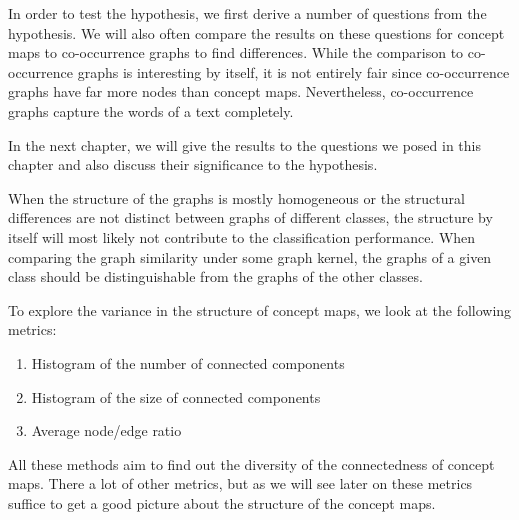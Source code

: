 


In order to test the hypothesis, we first derive a number of questions from the hypothesis.
We will also often compare the results on these questions for concept maps to co-occurrence graphs to find differences. While the comparison to co-occurrence graphs is interesting by itself, it is not entirely fair since co-occurrence graphs have far more nodes than concept maps.
Nevertheless, co-occurrence graphs capture the words of a text completely.

In the next chapter, we will give the results to the questions we posed in this chapter and also discuss their significance to the hypothesis.


When the structure of the graphs is mostly homogeneous or the structural differences are not distinct between graphs of different classes, the structure by itself will most likely not contribute to the classification performance.
When comparing the graph similarity under some graph kernel, the graphs of a given class should be distinguishable from the graphs of the other classes.

To explore the variance in the structure of concept maps, we look at the following metrics:
\begin{enumerate}
    \item{Histogram of the number of connected components}
    \item{Histogram of the size of connected components}
    \item{Average node/edge ratio}
\end{enumerate}

All these methods aim to find out the diversity of the connectedness of concept maps. There a lot of other metrics, but as we will see later on these metrics suffice to get a good picture about the structure of the concept maps.

